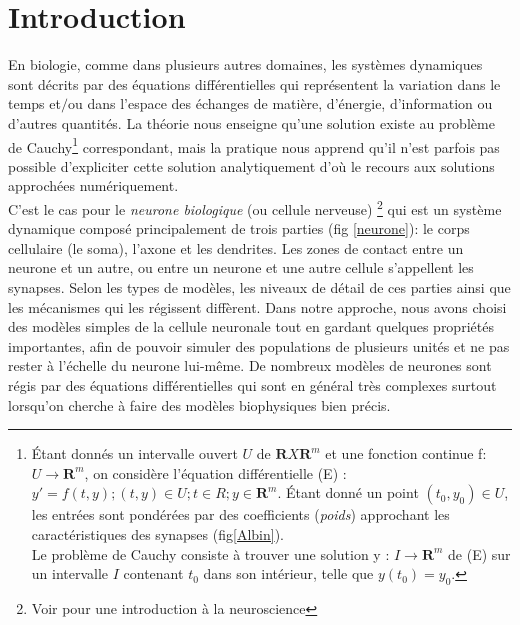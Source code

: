 \DontNumberThisInToc
\DontFrameThisInToc
\glsresetall
{}


\section{Introduction}

En biologie, comme dans plusieurs autres domaines, les systèmes dynamiques sont décrits par des équations différentielles qui représentent la variation dans le temps et$/$ou dans l'espace des échanges de matière, d'énergie, d'information ou d'autres quantités. La théorie nous enseigne qu'une solution existe au problème de Cauchy\footnote{\'Etant donnés un intervalle ouvert $U$ de $\mathbf{R} X \mathbf{R}^m$ et une fonction continue f: $U\rightarrow\mathbf{R}^m$, on considère l'équation différentielle (E) : $y' = f (t, y); (t, y) \in U; t \in R; y \in \mathbf{R}^m$. Étant donné un point $(t_0,y_0) \in U$, les entrées sont pondérées par des coefficients (\textit{poids}) approchant les caractéristiques des synapses (fig\ref{Albin}).\\  Le problème de Cauchy consiste à trouver une solution y : $I\rightarrow\mathbf{R}^m$ de (E)  sur un intervalle $I$ contenant $t_0$ dans son intérieur, telle que $y(t_0) = y_0$.} correspondant, mais la pratique nous apprend qu'il n'est parfois pas possible d'expliciter cette solution analytiquement d'o\`u le recours aux solutions approchées numériquement.\\

C'est le cas pour le \textit{neurone biologique} (ou cellule nerveuse) \footnote{Voir \cite{Kandel:1985} pour une introduction à la neuroscience} qui est un système dynamique composé principalement de trois parties (fig \ref{neurone}): le corps cellulaire (le soma), l'axone et les dendrites. Les zones de contact entre un neurone et un autre, ou entre un neurone et une autre cellule s'appellent les synapses. Selon les types de modèles, les niveaux de détail de ces parties ainsi que les mécanismes qui les régissent diffèrent. Dans notre approche, nous avons choisi des modèles simples de la cellule neuronale tout en gardant quelques propriétés importantes, afin de pouvoir simuler des populations de plusieurs unités et ne pas rester à l'échelle du neurone lui-même. De nombreux modèles de neurones sont régis par des équations différentielles qui sont en général très complexes surtout lorsqu'on cherche à faire des modèles biophysiques bien précis.\\

